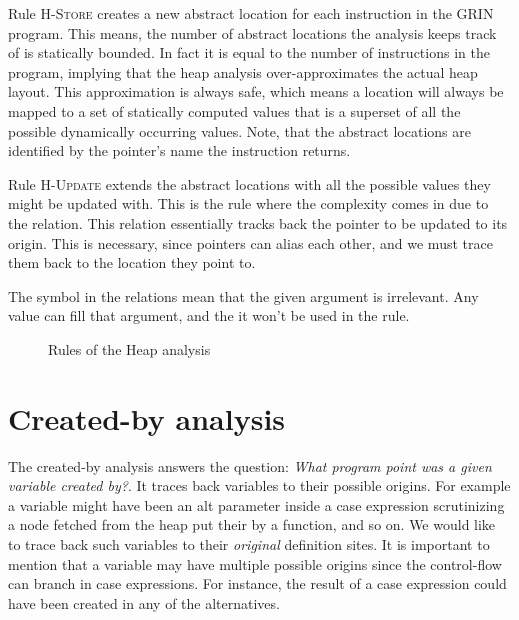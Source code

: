 \documentclass[main.tex]{subfiles}
\begin{document}
  Rule \textsc{H-Store} creates a new abstract location for each  instruction in the GRIN program. This means, the number of abstract locations the analysis keeps track of is statically bounded. In fact it is equal to the number of  instructions in the program, implying that the heap analysis over-approximates the actual heap layout. This approximation is always safe, which means a location will always be mapped to a set of statically computed values that is a superset of all the possible dynamically occurring values. Note, that the abstract locations are identified by the pointer's name the  instruction returns.
  
  Rule \textsc{H-Update} extends the abstract locations with all the possible values they might be updated with. This is the rule where the complexity comes in due to the  relation. This relation essentially tracks back the pointer to be updated to its origin. This is necessary, since pointers can alias each other, and we must trace them back to the location they point to.
  
  The \any symbol in the relations mean that the given argument is irrelevant. Any value can fill that argument, and the it won't be used in the rule.

  \begin{figure}[h]

  \caption{Rules of the Heap analysis}
  \label{fig:heap-analysis}
  \end{figure}


  \section{Created-by analysis} \label{sec:created-by}
  
  The created-by analysis answers the question: \emph{What program point was a given variable created by?}. It traces back variables to their possible origins. 
  For example a variable might have been an alt parameter inside a case expression scrutinizing a node fetched from the heap put their by a function, and so on. We would like to trace back such variables to their \emph{original} definition sites. It is important to mention that a variable may have multiple possible origins since the control-flow can branch in case expressions. For instance, the result of a case expression could have been created in any of the alternatives.
  
\end{document}
